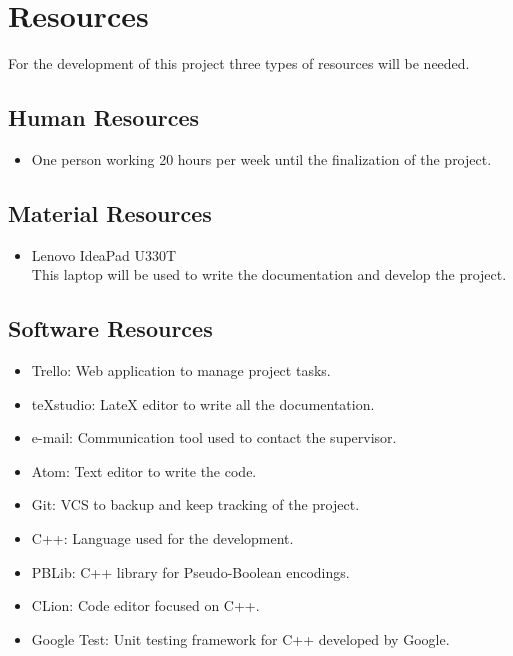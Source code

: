 
\chapter{Resources} %

\label{Chapter2} %


For the development of this project three types of resources will be needed.

\section{Human Resources}
\begin{itemize}
	\item One person working 20 hours per week until the finalization of the project.
\end{itemize}


\section{Material Resources}
\begin{itemize}
	\item Lenovo IdeaPad U330T\\
		This laptop will be used to write the documentation and develop the project.
\end{itemize}

\section{Software Resources}
\begin{itemize}
	\item Trello: Web application to manage project tasks.
	\item teXstudio: LateX editor to write all the documentation.
	\item e-mail: Communication tool used to contact the supervisor. 
	\item Atom: Text editor to write the code.
	\item Git: VCS to backup and keep tracking of the project.
	\item C++: Language used for the development.
	\item PBLib: C++ library for Pseudo-Boolean encodings.
	\item CLion: Code editor focused on C++.
	\item Google Test: Unit testing framework for C++ developed by Google.
\end{itemize}




